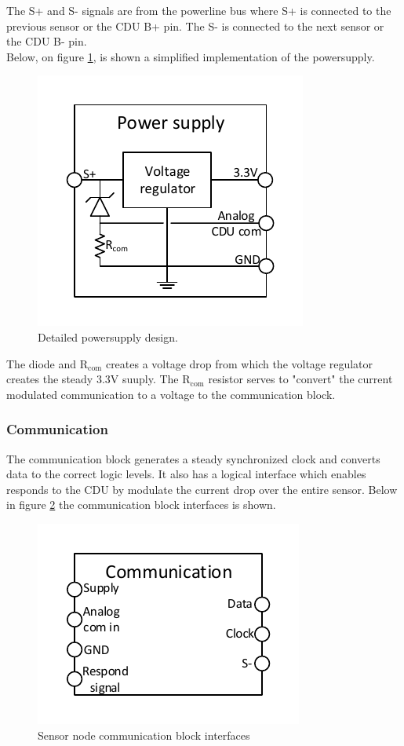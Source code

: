 The S+ and S- signals are from the powerline bus where S+ is connected to the previous sensor or the CDU B+ pin. The S- is connected to the next sensor or the CDU B- pin.\\
Below, on figure \ref{fig:SN_detailed_ps}, is shown a simplified implementation of the powersupply.

\begin{figure}[H]
	\centering
	\includegraphics[width=.5\textwidth]{billeder/powersupply_detailed_sn}
	\caption{Detailed powersupply design.}
	\label{fig:SN_detailed_ps}
\end{figure}

The diode and R$_{\text{com}}$ creates a voltage drop from which the voltage regulator creates the steady 3.3V suuply. The R$_{\text{com}}$ resistor serves to "convert" the current modulated communication to a voltage to the communication block.

\subsubsection{Communication}
The communication block generates a steady synchronized clock and converts data to the correct logic levels. It also has a logical interface which enables responds to the CDU by modulate the current drop over the entire sensor. Below in figure \ref{fig:SN_com_fig} the communication block interfaces is shown.

\begin{figure}[H]
	\centering
	\includegraphics[width=.5\textwidth]{billeder/communication_sn}
	\caption{Sensor node communication block interfaces}
	\label{fig:SN_com_fig}
\end{figure}

